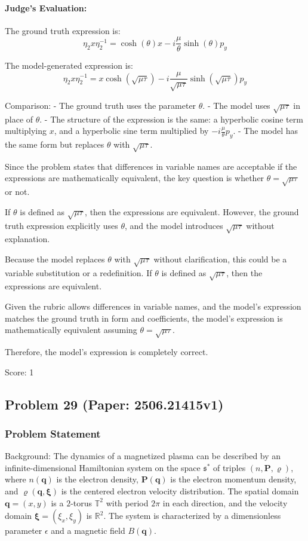 \documentclass[10pt]{article}
\begin{document}
\paragraph*{Judge's Evaluation:}

The ground truth expression is:
\[
\eta_2 x \eta_2^{-1} = \cosh(\theta) x - i \frac{\mu}{\theta} \sinh(\theta) p_y
\]

The model-generated expression is:
\[
\eta_2 x \eta_2^{-1} = x \cosh(\sqrt{\mu \tau}) - i \frac{\mu}{\sqrt{\mu \tau}} \sinh(\sqrt{\mu \tau}) p_y
\]

Comparison:
- The ground truth uses the parameter \(\theta\).
- The model uses \(\sqrt{\mu \tau}\) in place of \(\theta\).
- The structure of the expression is the same: a hyperbolic cosine term multiplying \(x\), and a hyperbolic sine term multiplied by \(-i \frac{\mu}{\theta} p_y\).
- The model has the same form but replaces \(\theta\) with \(\sqrt{\mu \tau}\).

Since the problem states that differences in variable names are acceptable if the expressions are mathematically equivalent, the key question is whether \(\theta = \sqrt{\mu \tau}\) or not.

If \(\theta\) is defined as \(\sqrt{\mu \tau}\), then the expressions are equivalent. However, the ground truth expression explicitly uses \(\theta\), and the model introduces \(\sqrt{\mu \tau}\) without explanation.

Because the model replaces \(\theta\) with \(\sqrt{\mu \tau}\) without clarification, this could be a variable substitution or a redefinition. If \(\theta\) is defined as \(\sqrt{\mu \tau}\), then the expressions are equivalent.

Given the rubric allows differences in variable names, and the model's expression matches the ground truth in form and coefficients, the model's expression is mathematically equivalent assuming \(\theta = \sqrt{\mu \tau}\).

Therefore, the model's expression is completely correct.

Score: 1

\newpage
\subsection*{Problem 29 (Paper: 2506.21415v1)}
\subsubsection*{Problem Statement}
Background:
The dynamics of a magnetized plasma can be described by an infinite-dimensional Hamiltonian system on the space $\mathfrak{s}^*$ of triples $(n,\bm{P},\varrho)$, where $n(\bm{q})$ is the electron density, $\bm{P}(\bm{q})$ is the electron momentum density, and $\varrho(\bm{q},\bm{\xi})$ is the centered electron velocity distribution. The spatial domain $\bm{q} = (x,y)$ is a $2$-torus $\mathbb{T}^2$ with period $2\pi$ in each direction, and the velocity domain $\bm{\xi} = (\xi_x,\xi_y)$ is $\mathbb{R}^2$. The system is characterized by a dimensionless parameter $\epsilon$ and a magnetic field $B(\bm{q})$.
\end{document}
